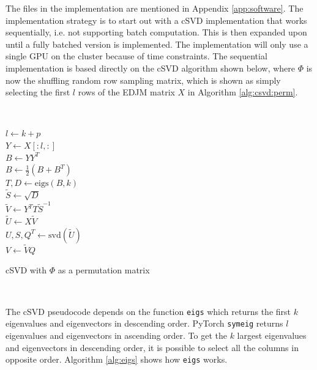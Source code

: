 The files in the implementation are mentioned in Appendix \ref{app:software}. The implementation strategy is to start out with a cSVD implementation that works sequentially, i.e. not supporting batch computation. This is then expanded upon until a fully batched version is implemented. The implementation will only use a single GPU on the cluster because of time constraints. The sequential implementation is based directly on the cSVD algorithm shown below, where $\Phi$ is now the shuffling random row sampling matrix, which is shown as simply selecting the first $l$ rows of the EDJM matrix $X$ in Algorithm \ref{alg:csvd:perm}.

$ $ \newline

\begin{algorithm}[H]
\SetAlgoLined
{}
$l \gets k + p$ \\
$Y \gets X[:l,:]$ \\
$B \gets Y Y^T$ \\
$B \gets \frac{1}{2}(B + B^T)$ \\
$T,D \gets \mathrm{eigs}(B,k)$ \\
$\tilde S \gets \sqrt{D}$ \\
$\tilde V \gets Y^T T \tilde S^{-1}$ \\
$\tilde U \gets X \tilde V$ \\
$U,S,Q^T \gets \mathrm{svd}(\tilde U)$ \\
$V \gets \tilde V Q$ \\
\caption{cSVD with $\Phi$ as a permutation matrix}
\label{alg:csvd:perm}
\end{algorithm}

$ $ \newline

The cSVD pseudocode depends on the function \texttt{eigs} which returns the first $k$ eigenvalues and eigenvectors in descending order. PyTorch \texttt{symeig} returns $l$ eigenvalues and eigenvectors in ascending order. To get the $k$ largest eigenvalues and eigenvectors in descending order, it is possible to select all the columns in opposite order. Algorithm \ref{alg:eigs} shows how \texttt{eigs} works.

$ $ \newline

